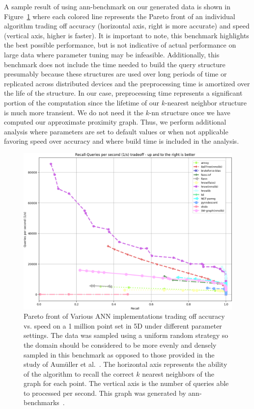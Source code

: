 A sample result of using ann-benchmark on our generated data is shown in Figure~\ref{fig:pareto} where each colored line represents the Pareto front of an individual algorithm trading off accuracy (horizontal axis, right is more accurate) and speed (vertical axis, higher is faster).
%
It is important to note, this benchmark highlights the best possible performance, but is not indicative of actual performance on large data where parameter tuning may be infeasible.
%
Additionally, this benchmark does not include the time needed to build the query structure presumably because these structures are used over long periods of time or replicated across distributed devices and the preprocessing time is amortized over the life of the structure.
%
In our case, preprocessing time represents a significant portion of the computation since the lifetime of our $k$-nearest neighbor structure is much more transient.
%
We do not need it the $k$-nn structure once we have computed our approximate proximity graph.
%
Thus, we perform additional analysis where parameters are set to default values or when not applicable favoring speed over accuracy and where build time is included in the analysis.

\begin{figure}[htbp]
    \centering
      \includegraphics[width=.95\linewidth]{figs/chap7/uniform-5-euclidean.png}
     \caption{Pareto front of Various ANN implementations trading off accuracy vs.
       speed on a 1 million point set in 5D under different parameter settings.
       The data was sampled using a uniform random strategy so the domain should be
       considered to be more evenly and densely sampled in this benchmark as
       opposed to those provided in the study of Aum{\"{u}}ller et
       al.~\cite{AumullerBernhardssonFaithfull2018}.
       The horizontal axis represents the ability of the algorithm to recall the
       correct $k$ nearest neighbors of the graph for each point.
       The vertical axis is the number of queries able to  processed per second.
       This graph was generated by ann-benchmarks~\cite{ANNBenchmark}.
     }
    \label{fig:pareto}
\end{figure}

